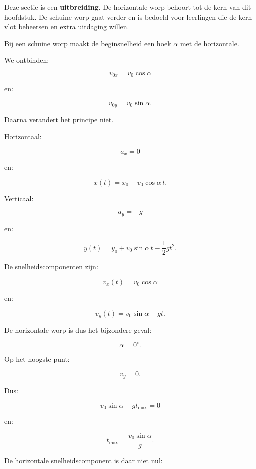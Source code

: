 \documentclass{ximera}
\begin{document}


\begin{opmerking}

Deze sectie is een \textbf{uitbreiding}. De horizontale worp behoort
tot de kern van dit hoofdstuk. De schuine worp gaat verder en is
bedoeld voor leerlingen die de kern vlot beheersen en extra uitdaging
willen.

\end{opmerking}

Bij een schuine worp maakt de beginsnelheid een hoek $\alpha$ met de
horizontale.

We ontbinden:

\[
\boxed{
v_{0x}=v_0\cos\alpha
}
\]

en:

\[
\boxed{
v_{0y}=v_0\sin\alpha.
}
\]

Daarna verandert het principe niet.

Horizontaal:

\[
a_x=0
\]

en:

\[
\boxed{
x(t)=x_0+v_0\cos\alpha\,t.
}
\]

Verticaal:

\[
a_y=-g
\]

en:

\[
\boxed{
y(t)
=
y_0+v_0\sin\alpha\,t-\frac12gt^2.
}
\]

De snelheidscomponenten zijn:

\[
\boxed{
v_x(t)=v_0\cos\alpha
}
\]

en:

\[
\boxed{
v_y(t)=v_0\sin\alpha-gt.
}
\]

De horizontale worp is dus het bijzondere geval:

\[
\boxed{\alpha=0^\circ.}
\]



Op het hoogste punt:

\[
v_y=0.
\]

Dus:

\[
v_0\sin\alpha-gt_{\max}=0
\]

en:

\[
\boxed{
t_{\max}
=
\frac{v_0\sin\alpha}{g}.
}
\]

De horizontale snelheidscomponent is daar niet nul:
\end{document}
